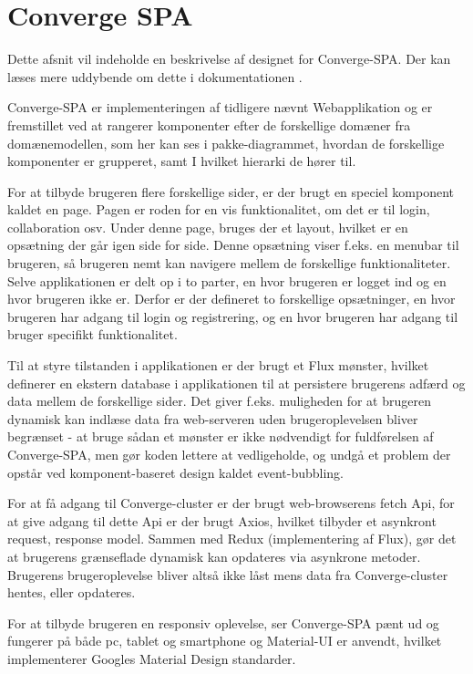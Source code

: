 \section{Converge SPA}

Dette afsnit vil indeholde en beskrivelse af designet for Converge-SPA. Der kan læses mere uddybende om dette i dokumentationen \cite[Converge-SPA]{software-design}.

Converge-SPA er implementeringen af tidligere nævnt Webapplikation og er fremstillet ved at rangerer komponenter efter de forskellige domæner fra domænemodellen, som her kan ses i pakke-diagrammet, hvordan de forskellige komponenter er grupperet, samt I hvilket hierarki de hører til.

For at tilbyde brugeren flere forskellige sider, er der brugt en speciel komponent kaldet en page. Pagen er roden for en vis 
funktionalitet, om det er til login, collaboration osv. Under denne page, bruges der et layout, hvilket er en opsætning der går igen side for side. Denne opsætning viser f.eks. en menubar til brugeren, så brugeren nemt kan navigere mellem de forskellige funktionaliteter. Selve applikationen er delt op i to parter, en hvor brugeren er logget ind og en hvor brugeren ikke er. Derfor er der defineret to forskellige opsætninger, en hvor brugeren har adgang til login og registrering, og en hvor brugeren har adgang til bruger specifikt funktionalitet.

Til at styre tilstanden i applikationen er der brugt et Flux mønster, hvilket definerer en ekstern database i applikationen til at persistere brugerens adfærd og data mellem de forskellige sider. Det giver f.eks. muligheden for at brugeren dynamisk kan indlæse data fra web-serveren uden brugeroplevelsen bliver begrænset - at bruge sådan et mønster er ikke nødvendigt for fuldførelsen af Converge-SPA, men gør koden lettere at vedligeholde, og undgå et problem der opstår ved komponent-baseret design kaldet event-bubbling.

For at få adgang til Converge-cluster er der brugt web-browserens fetch Api, for at give adgang til dette Api er der brugt Axios, hvilket tilbyder et asynkront request, response model. Sammen med Redux (implementering af Flux), gør det at brugerens grænseflade dynamisk kan opdateres via asynkrone metoder. Brugerens brugeroplevelse bliver altså ikke låst mens data fra Converge-cluster hentes, eller opdateres.

For at tilbyde brugeren en responsiv oplevelse, ser Converge-SPA pænt ud og fungerer på både pc, tablet og smartphone og Material-UI er anvendt, hvilket implementerer Googles Material Design standarder.
